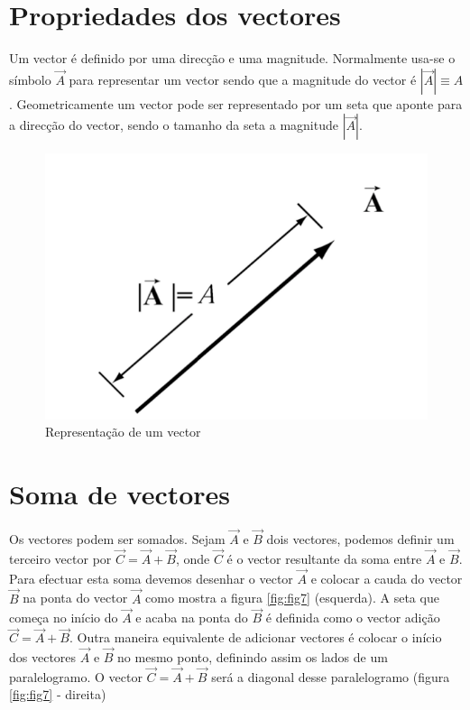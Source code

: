 \documentclass[
  portuguese,
  ]{book}
\begin{document}
\hypertarget{propriedades-dos-vectores}{%
\section{Propriedades dos vectores}\label{propriedades-dos-vectores}}

Um vector é definido por uma direcção e uma magnitude. Normalmente usa-se o símbolo \(\vec{A}\) para representar um vector sendo que a magnitude do vector é \(|\vec{A}|\equiv A\). Geometricamente um vector pode ser representado por um seta que aponte para a direcção do vector, sendo o tamanho da seta a magnitude \(|\vec{A}|\).

\begin{figure}

{\centering \includegraphics[width=0.5\linewidth]{img/6-vector} 

}

\caption{Representação de um vector}\label{fig:img6}
\end{figure}

\hypertarget{soma-de-vectores}{%
\section{Soma de vectores}\label{soma-de-vectores}}

Os vectores podem ser somados. Sejam \(\vec{A}\) e \(\vec{B}\) dois vectores, podemos definir um terceiro vector por \(\vec{C}=\vec{A}+\vec{B}\), onde \(\vec{C}\) é o vector resultante da soma entre \(\vec{A}\) e \(\vec{B}\). Para efectuar esta soma devemos desenhar o vector \(\vec{A}\) e colocar a cauda do vector \(\vec{B}\) na ponta do vector \(\vec{A}\) como mostra a figura \ref{fig:fig7} (esquerda). A seta que começa no início do \(\vec{A}\) e acaba na ponta do \(\vec{B}\) é definida como o vector adição \(\vec{C}=\vec{A}+\vec{B}\). Outra maneira equivalente de adicionar vectores é colocar o início dos vectores \(\vec{A}\) e \(\vec{B}\) no mesmo ponto, definindo assim os lados de um paralelogramo. O vector \(\vec{C}=\vec{A}+\vec{B}\) será a diagonal desse paralelogramo (figura \ref{fig:fig7} - direita)
\end{document}
